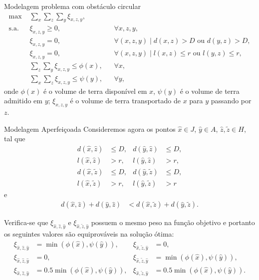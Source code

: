 \documentclass[11pt]{beamer}
\begin{document}
\begin{frame}{Modelagem problema com obstáculo circular}
    \begin{align*}
        \text{max } & \sum_{x} \sum_{z} \sum_{y} \xi_{x, z, y}, \\
        \text{s.a. } & \xi_{x, z, y} \geq 0, && \forall x, z, y, \\
        & \xi_{x, z, y} = 0, && \forall (x, z, y) \mid d(x, z) > D \text{ ou } 
        d(y, z) > D, \\
        & \xi_{x, z, y} = 0, && \forall (x, z, y) \mid l(x, z) \leq r \text{ ou }
        l(y, z) \leq r, \\
        & \sum_{z} \sum_{y} \xi_{x, z, y} \leq \phi(x), && \forall x, \\
        & \sum_{x} \sum_{z} \xi_{x, z, y} \leq \psi(y), && \forall y,
    \end{align*}
    onde $\phi(x)$ é o volume de terra disponível em $x$, $\psi(y)$ é o volume de
    terra admitido em $y$; $\xi_{x, z, y}$ é o volume de terra transportado de $x$
    para $y$ passando por $z$.
\end{frame}

\begin{frame}{Modelagem Aperfeiçoada}
    Consideremos agora os pontos $\hat{x} \in J$, $\hat{y} \in A$, $\hat{z},
    \tilde{z} \in H$, tal que
    \begin{align*}
        d(\hat{x}, \hat{z}) &\leq D, & d(\hat{y}, \hat{z}) &\leq D, \\
        l(\hat{x}, \hat{z}) &> r, & l(\hat{y}, \hat{z}) &> r, \\
        d(\hat{x}, \tilde{z}) &\leq D, & d(\hat{y}, \tilde{z}) &\leq D, \\
        l(\hat{x}, \tilde{z}) &> r, & l(\hat{y}, \tilde{z}) &> r
    \end{align*}
    e
    \begin{align*}
        d(\hat{x}, \hat{z}) + d(\hat{y}, \hat{z}) &< d(\hat{x}, \tilde{z}) +
        d(\hat{y}, \tilde{z}).
    \end{align*}

    \pause
    Verifica-se que
    $\xi_{\hat{x},\hat{z},\hat{y}}$ e $\xi_{\hat{x},\tilde{z},\hat{y}}$
    possuem o mesmo peso na fun\c{c}\~{a}o objetivo e portanto os seguintes valores
    s\~{a}o equiprov\'{a}veis na solu\c{c}\~{a}o \'{o}tima:
    \begin{align*}
        \xi_{\hat{x},\hat{z},\hat{y}} &= \min(\phi(\hat{x}), \psi(\hat{y})), &
        \xi_{\hat{x},\tilde{z},\hat{y}} &= 0, \\
        \xi_{\hat{x},\hat{z},\hat{y}} &= 0, &
        \xi_{\hat{x},\tilde{z},\hat{y}} &= \min(\phi(\hat{x}), \psi(\hat{y})), \\
        \xi_{\hat{x},\hat{z},\hat{y}} &= 0.5 \min(\phi(\hat{x}), \psi(\hat{y})), &
        \xi_{\hat{x},\tilde{z},\hat{y}} &= 0.5 \min(\phi(\hat{x}), \psi(\hat{y})).
    \end{align*}
\end{frame}
\end{document}
